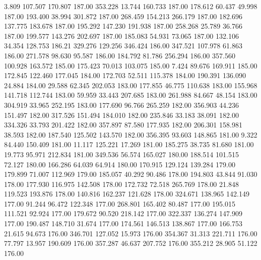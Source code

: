    3.809  107.507  170.807       187.00
 353.228   13.744  160.733       187.00
 178.612   60.437   49.998       187.00
 193.400   38.994  301.872       187.00
 268.459  154.213  266.179       187.00
 182.696  137.775  183.678       187.00
 195.292  147.230  191.938       187.00
 258.268   25.789   36.766       187.00
 199.577  143.276  202.697       187.00
 185.083   54.931   73.065       187.00
 132.106   34.354  128.753       186.21
 329.276  129.256  346.424       186.00
 347.521  107.978   61.863       186.00
 271.578   98.630   95.587       186.00
 184.792   81.786  256.294       186.00
 357.560  100.928  163.572       185.00
 175.423   70.013  103.075       185.00
   7.424   89.676  169.911       185.00
 172.845  122.460  177.045       184.00
 172.703   52.511  115.378       184.00
 190.391  136.090   24.884       184.00
  29.588   62.345  202.053       183.00
 177.855   46.775  110.638       183.00
 155.968  141.718  112.744       183.00
  59.959   33.443  207.685       183.00
 261.988   84.667   48.154       183.00
 304.919   33.965  252.195       183.00
 177.690   96.766  265.259       182.00
 356.903   44.236  151.497       182.00
 317.526  151.494  184.010       182.00
 235.846   33.183   38.091       182.00
 334.326   33.793  201.422       182.00
 357.897   87.580  177.935       182.00
 206.301  158.981   38.593       182.00
 187.540  125.502  143.570       182.00
 356.395   93.603  148.865       181.00
   9.322   84.440  150.409       181.00
  11.117  125.221   17.269       181.00
 185.275   38.735   81.680       181.00
  19.773   95.971  212.834       181.00
 349.536   56.574  165.027       180.00
 188.514  101.515   72.127       180.00
 166.286   64.039   64.914       180.00
 170.915  129.124  139.284       179.00
 179.899   71.007  112.969       179.00
 185.057   40.292   90.486       178.00
 194.803   43.844   91.030       178.00
 177.930  116.975  142.508       178.00
 172.732   72.518  265.769       178.00
  21.848  119.523  193.876       178.00
 140.816  162.237  121.628       178.00
 324.671  138.965  142.149       177.00
  91.244   96.472  122.348       177.00
 268.801  165.402   80.487       177.00
 195.015  111.521   92.924       177.00
 179.672   90.520  218.142       177.00
 322.337  136.274  147.909       177.00
 190.487  148.710   31.674       177.00
 174.561  146.513  138.867       177.00
 166.753   21.615   94.673       176.00
 346.701  127.052   15.973       176.00
 354.367   31.313  221.711       176.00
  77.797   13.957  190.609       176.00
 357.287   46.637  207.752       176.00
 355.212   28.905   51.122       176.00
